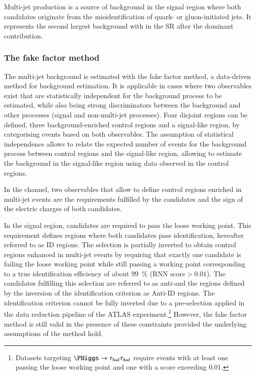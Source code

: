 \label{sec:hadhad_multijet}


Multi-jet production is a source of background in the \hadhad signal
region where both \tauhadvis candidates originate from the
misidentification of quark- or gluon-initiated jets. It represents the
second largest background with \faketauhadvis in the \hadhad SR after
the dominant \ttbarFakes contribution.

\subsubsection{The fake factor method}

The multi-jet background is estimated with the fake factor method, a
data-driven method for background estimation. It is applicable in
cases where two observables exist that are statistically independent
for the background process to be estimated, while also being strong
discriminators between the background and other processes (signal and
non-multi-jet processes). Four disjoint regions can be defined, three
background-enriched control regions and a signal-like region, by
categorising events based on both observables. The assumption of
statistical independence allows to relate the expected number of
events for the background process between control regions and the
signal-like region, allowing to estimate the background in the
signal-like region using data observed in the control regions.

In the \hadhad channel, two observables that allow to define control
regions enriched in multi-jet events are the \tauid requirements
fulfilled by the \tauhadvis candidates and the sign of the electric
charges of both candidates.

In the signal region, \tauhadvis candidates are required to pass the
loose \tauid working point. This requirement defines regions where
both \tauhadvis candidates pass identification, hereafter referred to
as ID regions. The selection is partially inverted to obtain control
regions enhanced in multi-jet events by requiring that exactly one
\tauhadvis candidate is failing the loose \tauid working point while
still passing a working point corresponding to a true \tauhadvis
identification efficiency of about \SI{99}{\percent}
($\text{RNN score} > 0.01$). The \tauhadvis candidates fulfilling this
selection are referred to as anti-\tauhadvis and the regions defined
by the inversion of the identification criterion as Anti-ID
regions. The identification criterion cannot be fully inverted due to
a pre-selection applied in the data reduction pipeline of the ATLAS
experiment.\footnote{Datasets targeting $\PHiggs \to \hadhad$ require
  events with at least one \tauhadvis passing the loose \tauid working
  point and one \tauhadvis with a \tauid score exceeding 0.01.}
However, the fake factor method is still valid in the presence of
these constraints provided the underlying assumptions of the method
hold.


